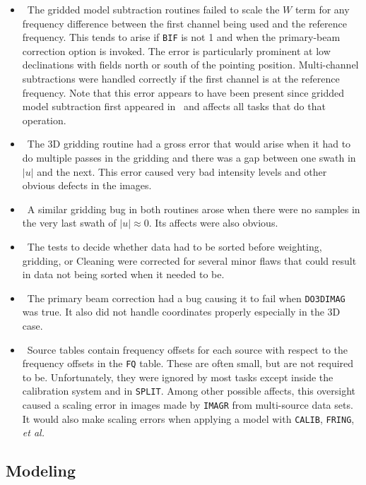 \begin{itemize}
\item\ The gridded model subtraction routines failed to scale the $W$
   term for any frequency difference between the first channel being
   used and the reference frequency.  This tends to arise if {\tt BIF}
   is not 1 and when the primary-beam correction option is invoked.
   The error is particularly prominent at low declinations with fields
   north or south of the pointing position.  Multi-channel
   subtractions were handled correctly if the first channel is at the
   reference frequency.  Note that this error appears to have been
   present since gridded model subtraction first appeared in \AIPS\
   and affects all tasks that do that operation.
\item\ The 3D gridding routine had a gross error that would arise when
   it had to do multiple passes in the gridding and there was a gap
   between one swath in $|u|$ and the next.  This error caused
   very bad intensity levels and other obvious defects in the images.
\item\ A similar gridding bug in both routines arose when there were no
   samples in the very last swath of $|u| \approx 0$.  Its affects
   were also obvious.
\item\ The tests to decide whether data had to be sorted before
   weighting, gridding, or Cleaning were corrected for several minor
   flaws that could result in data not being sorted when it needed to
   be.
\item\ The primary beam correction had a bug causing it to fail when
   {\tt DO3DIMAG} was true.  It also did not handle coordinates
   properly especially in the 3D case.
\item\ Source tables contain frequency offsets for each source with
   respect to the frequency offsets in the {\tt FQ} table.  These are
   often small, but are not required to be.  Unfortunately, they were
   ignored by most tasks except inside the calibration system and in
   {\tt SPLIT}\@.  Among other possible affects, this oversight caused
   a scaling error in images made by {\tt IMAGR} from multi-source
   data sets.  It would also make scaling errors when applying  a
   model with {\tt CALIB}, {\tt FRING}, {\it et al.}
\end{itemize}
\vfill\eject

\subsection{Modeling}

